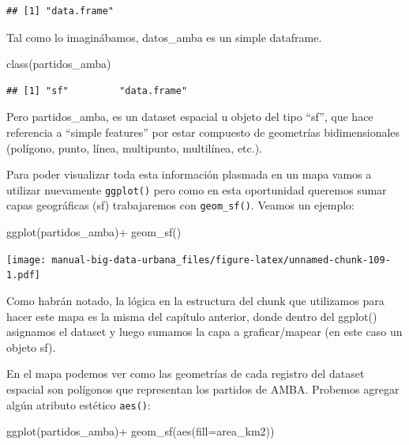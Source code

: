 \documentclass[
  spanish,
]{book}
\newenvironment{Shaded}{\begin{snugshade}}{\end{snugshade}}
\newcommand{\AttributeTok}[1]{\textcolor[rgb]{0.77,0.63,0.00}{#1}}
\newcommand{\FunctionTok}[1]{\textcolor[rgb]{0.00,0.00,0.00}{#1}}
\newcommand{\NormalTok}[1]{#1}
\newcommand{\SpecialCharTok}[1]{\textcolor[rgb]{0.00,0.00,0.00}{#1}}
\begin{document}
\begin{verbatim}
## [1] "data.frame"
\end{verbatim}

Tal como lo imaginábamos, datos\_amba es un simple dataframe.

\begin{Shaded}
\begin{Highlighting}[]
\FunctionTok{class}\NormalTok{(partidos\_amba)}
\end{Highlighting}
\end{Shaded}

\begin{verbatim}
## [1] "sf"         "data.frame"
\end{verbatim}

Pero partidos\_amba, es un dataset espacial u objeto del tipo ``sf'', que hace referencia a ``simple features'' por estar compuesto de geometrías bidimensionales (polígono, punto, línea, multipunto, multilínea, etc.).

Para poder visualizar toda esta información plasmada en un mapa vamos a utilizar nuevamente \texttt{ggplot()} pero como en esta oportunidad queremos sumar capas geográficas (sf) trabajaremos con \texttt{geom\_sf()}. Veamos un ejemplo:

\begin{Shaded}
\begin{Highlighting}[]
\FunctionTok{ggplot}\NormalTok{(partidos\_amba)}\SpecialCharTok{+}
  \FunctionTok{geom\_sf}\NormalTok{()}
\end{Highlighting}
\end{Shaded}

\texttt{[image: manual-big-data-urbana\_files/figure-latex/unnamed-chunk-109-1.pdf]}

Como habrán notado, la lógica en la estructura del chunk que utilizamos para hacer este mapa es la misma del capítulo anterior, donde dentro del ggplot() asignamos el dataset y luego sumamos la capa a graficar/mapear (en este caso un objeto sf).

En el mapa podemos ver como las geometrías de cada registro del dataset espacial son polígonos que representan los partidos de AMBA. Probemos agregar algún atributo estético \texttt{aes()}:

\begin{Shaded}
\begin{Highlighting}[]
\FunctionTok{ggplot}\NormalTok{(partidos\_amba)}\SpecialCharTok{+}
  \FunctionTok{geom\_sf}\NormalTok{(}\FunctionTok{aes}\NormalTok{(}\AttributeTok{fill=}\NormalTok{area\_km2))}
\end{Highlighting}
\end{Shaded}
\end{document}
